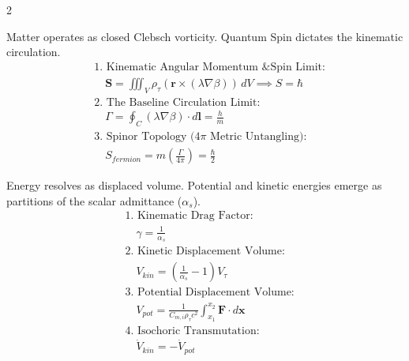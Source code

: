 \begin{multicols}{2}
\begin{tcolorbox}[cheatbox, title={\refstepcounter{cheatnum}\label{box:quantum_spin}\thecheatnum. Kinematic Circulation \& The Origin of Spin \scriptsize\hfill\hyperref[sec:deriv_quantum_spin]{[Proof $\downarrow$]}}] 
Matter operates as closed Clebsch vorticity. Quantum Spin dictates the kinematic circulation. 
\begin{align}
    &\text{1. Kinematic Angular Momentum \& Spin Limit:} \nonumber \\
    &\quad \mathbf{S} = \iiint_V \rho_\tau (\mathbf{r} \times (\lambda \nabla \beta)) \, dV \implies S = \hbar \label{eq:transverse_shear_spin} \\
    &\text{2. The Baseline Circulation Limit:} \nonumber \\
    &\quad \Gamma = \oint_C (\lambda \nabla \beta) \cdot d\mathbf{l} = \frac{h}{m} \label{eq:fluid_circulation} \\
    &\text{3. Spinor Topology ($4\pi$ Metric Untangling):} \nonumber \\ 
    &\quad S_{fermion} = m \left( \frac{\Gamma}{4\pi} \right) = \frac{\hbar}{2} \label{eq:spinor_topology}
\end{align}
\end{tcolorbox}

\begin{tcolorbox}[cheatbox, title={\refstepcounter{cheatnum}\label{box:volumetric_energy}\thecheatnum. Kinetic-Potential Strain Conservation \scriptsize\hfill\hyperref[sec:deriv_volumetric_energy]{[Proof $\downarrow$]}}]
Energy resolves as displaced volume. Potential and kinetic energies emerge as partitions of the scalar admittance ($\alpha_s$). 
\begin{align}
    &\text{1. Kinematic Drag Factor:} \nonumber \\
    &\quad \gamma = \frac{1}{\alpha_s} \label{eq:strain_lorentz} \\
    &\text{2. Kinetic Displacement Volume:} \nonumber \\
    &\quad V_{kin} = \left( \frac{1}{\alpha_s} - 1 \right) V_\tau \label{eq:kinetic_volume} \\
    &\text{3. Potential Displacement Volume:} \nonumber \\
    &\quad V_{pot} = \frac{1}{C_{m,i}\rho_{\tau} c^2} \int_{x_1}^{x_2} \mathbf{F} \cdot d\mathbf{x} \label{eq:potential_volume} \\
    &\text{4. Isochoric Transmutation:} \nonumber \\
    &\quad \dot{V}_{kin} = -\dot{V}_{pot} \label{eq:isochoric_transmutation}
\end{align}
\end{tcolorbox}



\end{multicols}
